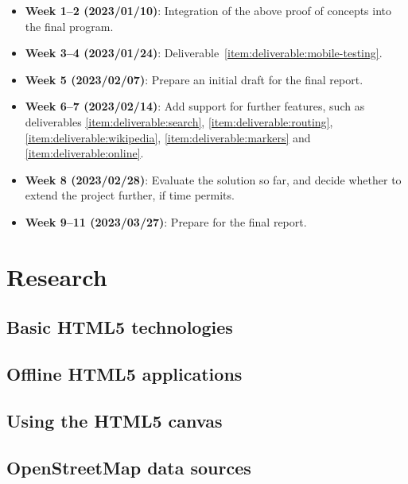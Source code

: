 \documentclass[]{final_report}
\begin{document}
\begin{itemize}
    \item \textbf{Week 1--2 (2023/01/10)}: Integration of the above proof of concepts into the final program.
    \item \textbf{Week 3--4 (2023/01/24)}: Deliverable~\ref{item:deliverable:mobile-testing}.
    \item \textbf{Week 5 (2023/02/07)}: Prepare an initial draft for the final report.
    \item \textbf{Week 6--7 (2023/02/14)}: Add support for further features, such as deliverables \ref{item:deliverable:search}, \ref{item:deliverable:routing}, \ref{item:deliverable:wikipedia}, \ref{item:deliverable:markers} and \ref{item:deliverable:online}.
    \item \textbf{Week 8 (2023/02/28)}: Evaluate the solution so far, and decide whether to extend the project further, if time permits.
    \item \textbf{Week 9--11 (2023/03/27)}: Prepare for the final report.
\end{itemize}

\chapter{Research}

\section{Basic HTML5 technologies}


\section{Offline HTML5 applications}\label{sec:offline-html-applications}



\section{Using the HTML5 canvas}



\section{OpenStreetMap data sources}
\end{document}
